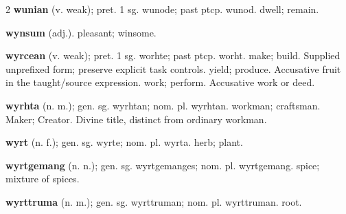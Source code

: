 \begin{multicols*}{2}
\textbf{wunian} (v. weak); pret. 1 sg. wunode; past ptcp. wunod. dwell; remain.\par
\textbf{wynsum} (adj.). pleasant; winsome.\par
\textbf{wyrcean} (v. weak); pret. 1 sg. worhte; past ptcp. worht. make; build. Supplied unprefixed form; preserve explicit task controls. yield; produce. Accusative fruit in the taught/source expression. work; perform. Accusative work or deed.\par
\textbf{wyrhta} (n. m.); gen. sg. wyrhtan; nom. pl. wyrhtan. workman; craftsman. Maker; Creator. Divine title, distinct from ordinary workman.\par
\textbf{wyrt} (n. f.); gen. sg. wyrte; nom. pl. wyrta. herb; plant.\par
\textbf{wyrtgemang} (n. n.); gen. sg. wyrtgemanges; nom. pl. wyrtgemang. spice; mixture of spices.\par
\textbf{wyrttruma} (n. m.); gen. sg. wyrttruman; nom. pl. wyrttruman. root.\par

\end{multicols*}
